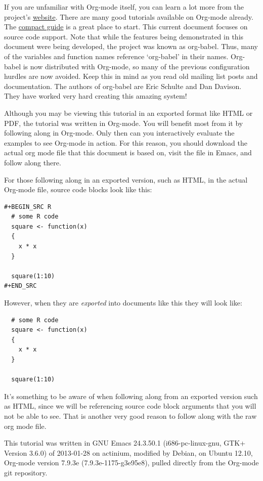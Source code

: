 \documentclass[11pt]{article}
\begin{document}
If you are unfamiliar with Org-mode itself, you can learn a lot more
from the project's \href{http://orgmode.org}{website}. There are many good tutorials available on
Org-mode already. The \href{http://orgmode.org/guide/index.html}{compact guide} is a great place to start. This
current document focuses on source code support. Note that while the
features being demonstrated in this document were being developed, the
project was known as org-babel. Thus, many of the variables and
function names reference `org-babel' in their names. Org-babel is now
distributed with Org-mode, so many of the previous configuration
hurdles are now avoided. Keep this in mind as you read old mailing
list posts and documentation. The authors of org-babel are Eric
Schulte and Dan Davison. They have worked very hard creating this
amazing system!

Although you may be viewing this tutorial in an exported format like
HTML or PDF, the tutorial was written in Org-mode. You will benefit
most from it by following along in Org-mode. Only then can you
interactively evaluate the examples to see Org-mode in action. For
this reason, you should download the actual org mode file that this
document is based on, visit the file in Emacs, and follow along there.

For those following along in an exported version, such as HTML, in the
actual Org-mode file, source code blocks look like this:

\begin{verbatim}
#+BEGIN_SRC R 
  # some R code 
  square <- function(x) 
  {
    x * x
  }
    
  square(1:10)
#+END_SRC
\end{verbatim}

However, when they are \emph{exported} into documents like this they will
look like:

\begin{verbatim}
  # some R code 
  square <- function(x) 
  {
    x * x
  }
    
  square(1:10)
\end{verbatim}

It's something to be aware of when following along from an exported
version such as HTML, since we will be referencing source code block
arguments that you will not be able to see.  That is another very good
reason to follow along with the raw org mode file.

This tutorial was written in GNU Emacs 24.3.50.1 (i686-pc-linux-gnu,
GTK+ Version 3.6.0) of 2013-01-28 on actinium, modified by Debian, on
Ubuntu 12.10, Org-mode version 7.9.3e (7.9.3e-1175-g3e95e8), pulled
directly from the Org-mode git repository.
\end{document}
